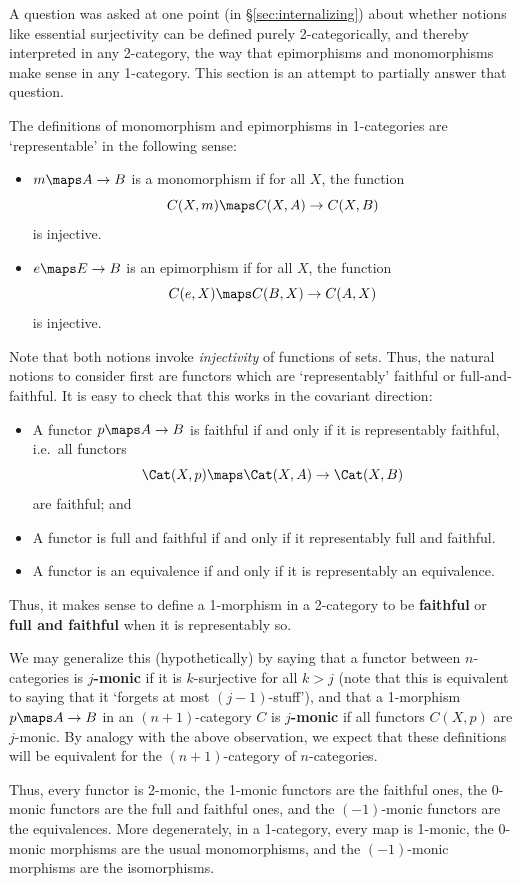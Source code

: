 \documentclass[12pt]{amsart}
\begin{document}
A question was asked at one point (in \S\ref{sec:internalizing}) about
whether notions like essential surjectivity can be defined purely
2-categorically, and thereby interpreted in any 2-category, the way
that epimorphisms and monomorphisms make sense in any 1-category.
This section is an attempt to partially answer that question.

The definitions of monomorphism and epimorphisms in 1-categories are
`representable' in the following sense:
\begin{itemize}
\item $m\maps A\to B$ is a monomorphism if for all $X$, the
  function
  \[C(X,m)\maps C(X,A)\to C(X,B)\]
  is injective.
\item $e\maps E\to B$ is an epimorphism if for all $X$,
  the function 
  \[C(e,X)\maps C(B,X)\to C(A,X)\]
  is injective.
\end{itemize}

Note that both notions invoke \emph{injectivity} of functions of sets.
Thus, the natural notions to consider first are functors which are
`representably' faithful or full-and-faithful.  It is easy to check
that this works in the covariant direction:
\begin{itemize}
\item A functor $p\maps A\to B$ is faithful if and only if it is
  representably faithful, i.e.\ all functors
  \[\Cat(X,p)\maps \Cat(X,A)\to \Cat(X,B)\]
  are faithful; and
\item A functor is full and faithful if and only if it representably
  full and faithful.
\item A functor is an equivalence if and only if it is representably
  an equivalence.
\end{itemize}
Thus, it makes sense to define a 1-morphism in a 2-category to be
\textbf{faithful} or \textbf{full and faithful} when it is representably
so.

We may generalize this (hypothetically) by saying that a functor
between $n$-categories is \textbf{$j$-monic} if it is $k$-surjective for
all $k > j$ (note that this is equivalent to saying that it `forgets
at most $(j-1)$-stuff'), and that a 1-morphism $p\maps A\to B$ in an
$(n+1)$-category $C$ is \textbf{$j$-monic} if all functors $C(X,p)$ are
$j$-monic.  By analogy with the above observation, we expect that
these definitions will be equivalent for the $(n+1)$-category of
$n$-categories.

Thus, every functor is 2-monic, the 1-monic functors are the faithful
ones, the 0-monic functors are the full and faithful ones, and the
$(-1)$-monic functors are the equivalences.  More degenerately, in a
1-category, every map is 1-monic, the 0-monic morphisms are the usual
monomorphisms, and the $(-1)$-monic morphisms are the isomorphisms.
\end{document}

